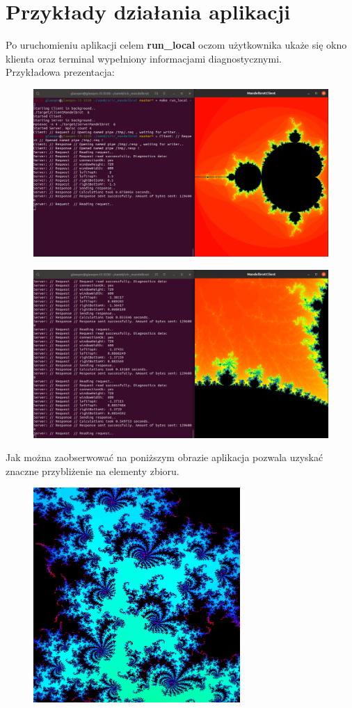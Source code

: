 \section{Przykłady działania aplikacji}
Po uruchomieniu aplikacji celem \textbf{run\_local} oczom użytkownika ukaże się
okno klienta oraz terminal wypełniony informacjami diagnostycznymi.\\

Przykładowa prezentacja:
\begin{figure}[H]
    \centering
    \includegraphics[width = \textwidth]{img/ex1.png}
\end{figure}

\begin{figure}[H]
    \centering
    \includegraphics[width = \textwidth]{img/ex2.png}
\end{figure}

Jak można zaobserwować na poniższym obrazie aplikacja pozwala uzyskać znaczne przybliżenie na elementy zbioru.
\begin{figure}[H]
    \centering
    \includegraphics[width = 0.7\textwidth]{img/ex3.png}
\end{figure}